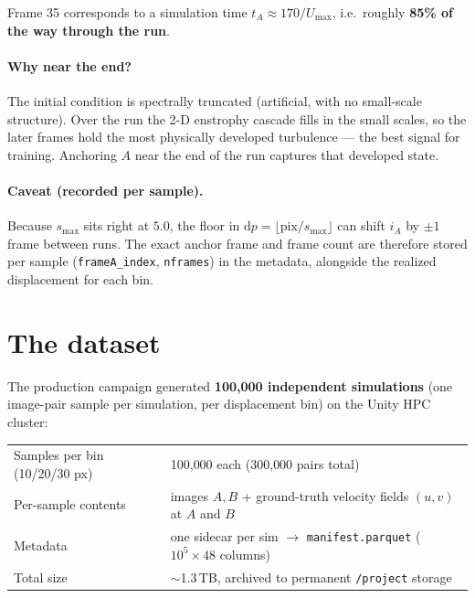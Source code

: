 \documentclass[11pt]{article}
\newcommand{\code}[1]{\texttt{\small #1}}
\begin{document}
\noindent
Frame 35 corresponds to a simulation time $t_A \approx 170/U_{\max}$, i.e.\ roughly
\textbf{85\% of the way through the run}.

\paragraph{Why near the end?} The initial condition is spectrally truncated
(artificial, with no small-scale structure). Over the run the 2-D enstrophy cascade
fills in the small scales, so the later frames hold the most physically developed
turbulence --- the best signal for training. Anchoring $A$ near the end of the run
captures that developed state.

\paragraph{Caveat (recorded per sample).} Because $s_{\max}$ sits right at $5.0$,
the floor in $\mathrm{d}p=\lfloor\text{pix}/s_{\max}\rfloor$ can shift $i_A$ by
$\pm1$ frame between runs. The exact anchor frame and frame count are therefore
stored per sample (\code{frameA\_index}, \code{nframes}) in the metadata, alongside
the realized displacement for each bin.

\section{The dataset}
The production campaign generated \textbf{100{,}000 independent simulations}
(one image-pair sample per simulation, per displacement bin) on the Unity HPC
cluster:

\begin{center}
\begin{tabular}{ll}
  \toprule
  Samples per bin (10/20/30 px) & 100{,}000 each (300{,}000 pairs total) \\
  Per-sample contents           & images $A,B$ + ground-truth velocity fields $(u,v)$ at $A$ and $B$ \\
  Metadata                      & one sidecar per sim $\rightarrow$ \code{manifest.parquet} ($10^5 \times 48$ columns) \\
  Total size                    & $\sim$1.3\,TB, archived to permanent \code{/project} storage \\
  \bottomrule
\end{tabular}
\end{center}
\end{document}
